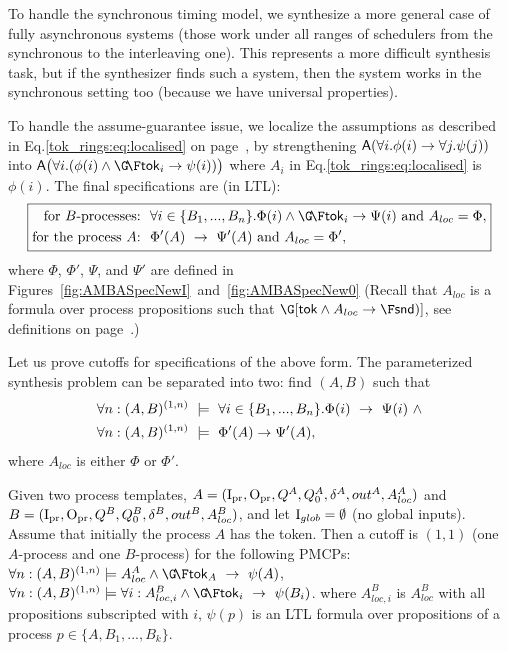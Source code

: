  To handle the synchronous timing model, we synthesize a more general case of fully asynchronous systems
  (those work under all ranges of schedulers from the synchronous to the interleaving one).
  This represents a more difficult synthesis task,
  but if the synthesizer finds such a system,
  then the system works in the synchronous setting too
  (because we have universal properties).

  To handle the assume-guarantee issue,
  we localize the assumptions as described in Eq.\ref{tok_rings:eq:localised} on page~\pageref{tok_rings:eq:localised},
  by strengthening
  ${\operatorname{\mathsf{A}}}(\forall i. \phi(i) \rightarrow \forall j. \psi(j))$ into
  $\A\big(\forall i. (\phi(i)\land\GF\token_i \impl \psi(i))\big)$
  where $A_i$ in Eq.\ref{tok_rings:eq:localised} is $\phi(i)$.
  The final specifications are (in LTL):
  \begin{equation}\label{eq:amba:final-spec}
  \boxed{
  \begin{aligned}
    \text{for $B$-processes:}
    &~~\forall{i \in \{B_1,...,B_n\}}. \Phi(i)\land\GF\token_i \impl \Psi(i)
    \text{ and } A_{loc} = \Phi,\\
    \text{for the process $A$:}
    &~~\Phi'(A) ~\impl~ \Psi'(A) \text{ and } A_{loc} = \Phi',
  \end{aligned}
  }
  \end{equation}
  where $\Phi$, $\Phi'$, $\Psi$, and $\Psi'$ are defined in Figures~\ref{fig:AMBASpecNewI}~and~\ref{fig:AMBASpecNew0}
  (Recall that $A_{loc}$ is a formula over process propositions
   such that $\G[\token \land A_{loc} \impl \F \tsnd)]$,
   see definitions on page~\pageref{page:tok_rings:defs:process_template}.)

  Let us prove cutoffs for specifications of the above form.
  The parameterized synthesis problem can be separated into two: find $(A,B)$ such that
  \begin{align*}
  \begin{aligned}
  &\forall n: (A,B)^{(1,n)} ~\models~ \forall{i \in \{B_1,...,B_n\}}. \Phi(i) ~\rightarrow~ \Psi(i) ~\land\\
  &\forall n: (A,B)^{(1,n)} ~\models~ \Phi'(A) \rightarrow \Psi'(A),
  \end{aligned}
  \end{align*}
  where $A_{loc}$ is either $\Phi$ or $\Phi'$.

  \begin{theorem}
    Given two process templates,
    $A=({\mathrm{I}_{\mathrm{pr}}},{\mathrm{O}_{\mathrm{pr}}},Q^A,Q_0^A,\delta^A,out^A,A^A_{loc})$ and
    $B=({\mathrm{I}_{\mathrm{pr}}},{\mathrm{O}_{\mathrm{pr}}},Q^B,Q_0^B,\delta^B,out^B,A^B_{loc})$,
    and let $\mathrm{I}_{glob}=\emptyset$ (no global inputs).
    Assume that initially the process $A$ has the token.
    Then a cutoff is $(1,1)$ (one $A$-process and one $B$-process) for the following PMCPs:
    \li
    \-[(1)] $\forall n: (A,B)^{(1,n)} \models A^A_{loc} \land \GF\token_A ~\impl~ \psi(A)$,
    \-[(2)] $\forall n: (A,B)^{(1,n)} \models \forall i: A^B_{loc,i} \land \GF\token_i ~\impl~ \psi(B_i)$.
    \il
    where
    $A^B_{loc,i}$ is $A^B_{loc}$ with all propositions subscripted with $i$,
    $\psi(p)$ is an LTL formula over propositions of a process $p \in \{A,B_1,...,B_k\}$.
  \end{theorem}

